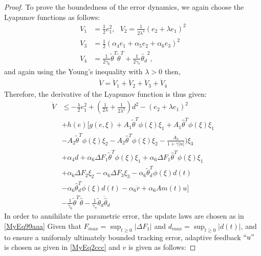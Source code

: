 \documentclass{article} %
\newtheorem{proof}{Proof}
\begin{document}
\begin{proof}
To prove the boundedness of the error dynamics, we again choose the Lyapunov functions as follows:
\begin{equation} \label{MyEq88}
  \begin{split}
  V_1 &= \tfrac{1}{2}e_1^2,\ \ \ V_2=\tfrac{1}{2\lambda^4}(e_2+\lambda e_1)^2\\
   V_3 &=\tfrac{1}{2}(\alpha_4 e_1 + \alpha_5 e_2 + \alpha_6 e_3)^2\\ V_4 &=\tfrac{1}{2\gamma_6}{\tilde{\theta}}^T{\tilde{\theta}}^T+\tfrac{1}{2\gamma_7}{\tilde{\theta_d}}^2,
  \end{split}
\end{equation}
and again using the Young's inequality with  $\lambda >0$ then,
\begin{equation} \label{MyEq103}
  \begin{split}
  {\dot V}= {\dot V_1}+{\dot V_2}+{\dot V_3}+{\dot V_4}
  \end{split}
\end{equation}
Therefore, the derivative of the Lyapunov function is thus given:
\begin{equation} \label{MyEq104}
  \begin{split}
  {\dot V} & \leq  -\tfrac{\lambda}{2} e_1^2+ (\tfrac{1}{2\lambda}+\tfrac{1}{2\lambda^5})d^2-(e_2+ \lambda e_1)^2\\
  &+ h(e)[g(e,\xi)+A_1\tilde{\theta}^T\phi(\xi)\xi_1+A_1{\hat\theta}^T\phi(\xi)\xi_1\\
  &-A_2\tilde{\theta}^T\phi(\xi)\xi_2-A_2{\hat\theta}^T\phi(\xi)\xi_2-\tfrac{A_3}{1+\gamma \lvert u \rvert})\xi_3 \\
  &+ \alpha_4d+  \alpha_6\Delta F_1\tilde{\theta}^T\phi(\xi)\xi_1+\alpha_6\Delta F_1{\hat\theta}^T\phi(\xi)\xi_1\\
  &+\alpha_6\Delta F_2\xi_2-\alpha_6\Delta F_3\xi_3-\alpha_6\tilde{\theta}_d^T\phi(\xi)d(t)\\
  &-\alpha_6{\hat\theta}_d^T\phi(\xi)d(t)-\alpha_6{\dddot r} + \alpha_6Am(t)u]\\
   &-\tfrac{1}{\gamma_6}{\tilde{\theta}}^T{\dot {\hat \theta}}-\tfrac{1}{\gamma_7}\tilde{\theta}_d{\dot {\hat \theta}_d}
  \end{split}
\end{equation}
In order to annihilate the parametric error, the update laws are chosen as in \eqref{MyEq99aaa}
Given that $F_{max}=\sup_{t \geq 0}|\Delta F_1|$ and $d_{max}= \sup_{t \geq 0}|d(t)|$, and to ensure a uniformly ultimately bounded tracking error, adaptive feedback $``u"$ is chosen as given in \eqref{MyEq2ccc} and $v$ is given as follows:

\end{proof}
\end{document}
